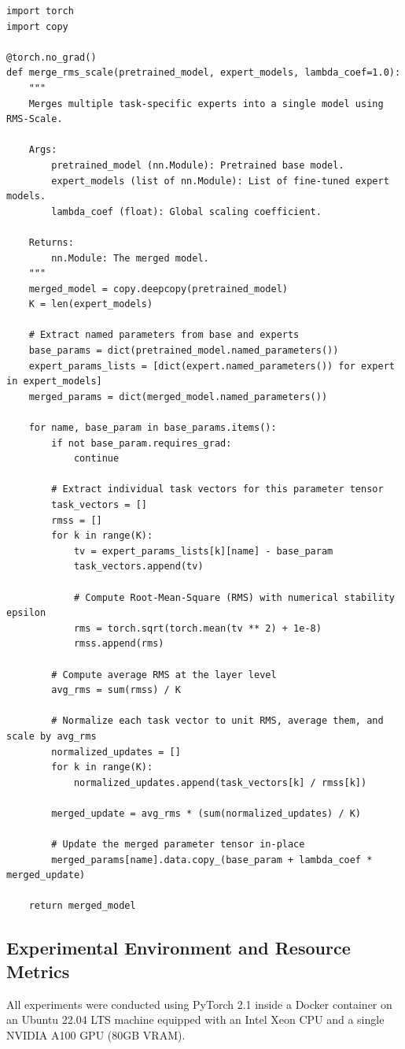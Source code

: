 \documentclass{article}
\theoremstyle{plain}
\theoremstyle{definition}
\theoremstyle{remark}
\begin{document}
\begin{verbatim}
import torch
import copy

@torch.no_grad()
def merge_rms_scale(pretrained_model, expert_models, lambda_coef=1.0):
    """
    Merges multiple task-specific experts into a single model using RMS-Scale.
    
    Args:
        pretrained_model (nn.Module): Pretrained base model.
        expert_models (list of nn.Module): List of fine-tuned expert models.
        lambda_coef (float): Global scaling coefficient.
        
    Returns:
        nn.Module: The merged model.
    """
    merged_model = copy.deepcopy(pretrained_model)
    K = len(expert_models)
    
    # Extract named parameters from base and experts
    base_params = dict(pretrained_model.named_parameters())
    expert_params_lists = [dict(expert.named_parameters()) for expert in expert_models]
    merged_params = dict(merged_model.named_parameters())
    
    for name, base_param in base_params.items():
        if not base_param.requires_grad:
            continue
            
        # Extract individual task vectors for this parameter tensor
        task_vectors = []
        rmss = []
        for k in range(K):
            tv = expert_params_lists[k][name] - base_param
            task_vectors.append(tv)
            
            # Compute Root-Mean-Square (RMS) with numerical stability epsilon
            rms = torch.sqrt(torch.mean(tv ** 2) + 1e-8)
            rmss.append(rms)
            
        # Compute average RMS at the layer level
        avg_rms = sum(rmss) / K
        
        # Normalize each task vector to unit RMS, average them, and scale by avg_rms
        normalized_updates = []
        for k in range(K):
            normalized_updates.append(task_vectors[k] / rmss[k])
            
        merged_update = avg_rms * (sum(normalized_updates) / K)
        
        # Update the merged parameter tensor in-place
        merged_params[name].data.copy_(base_param + lambda_coef * merged_update)
        
    return merged_model
\end{verbatim}

\subsection{Experimental Environment and Resource Metrics}
All experiments were conducted using PyTorch 2.1 inside a Docker container on an Ubuntu 22.04 LTS machine equipped with an Intel Xeon CPU and a single NVIDIA A100 GPU (80GB VRAM). 
\end{document}
